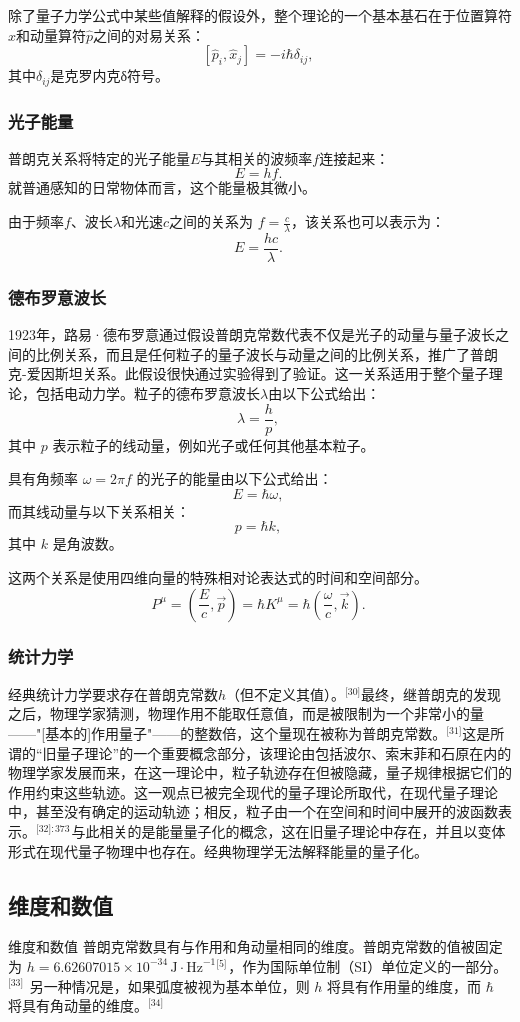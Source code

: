 除了量子力学公式中某些值解释的假设外，整个理论的一个基本基石在于位置算符\( \hat{x} \)和动量算符\( \hat{p} \)之间的对易关系：
\[
[{\hat {p}}_{i},{\hat {x}}_{j}] = -i\hbar \delta_{ij},~
\]
其中\( \delta_{ij} \)是克罗内克δ符号。
\subsubsection{光子能量}  
普朗克关系将特定的光子能量\( E \)与其相关的波频率\( f \)连接起来：
\[
E = hf.~
\]
就普通感知的日常物体而言，这个能量极其微小。

由于频率\( f \)、波长\( \lambda \)和光速\( c \)之间的关系为 \( f = \frac{c}{\lambda} \)，该关系也可以表示为：
\[
E = \frac{hc}{\lambda}.~
\]
\subsubsection{德布罗意波长}  
1923年，路易·德布罗意通过假设普朗克常数代表不仅是光子的动量与量子波长之间的比例关系，而且是任何粒子的量子波长与动量之间的比例关系，推广了普朗克-爱因斯坦关系。此假设很快通过实验得到了验证。这一关系适用于整个量子理论，包括电动力学。粒子的德布罗意波长\(\lambda\)由以下公式给出：
\[
\lambda = \frac{h}{p},~
\]
其中 \( p \) 表示粒子的线动量，例如光子或任何其他基本粒子。

具有角频率 \( \omega = 2\pi f \) 的光子的能量由以下公式给出：
\[
E = \hbar \omega,~
\]
而其线动量与以下关系相关：
\[
p = \hbar k,~
\]
其中 \( k \) 是角波数。

这两个关系是使用四维向量的特殊相对论表达式的时间和空间部分。
\[
P^{\mu} = \left( \frac{E}{c}, \vec{p} \right) = \hbar K^{\mu} = \hbar \left( \frac{\omega}{c}, \vec{k} \right).~
\]
\subsubsection{统计力学}  
经典统计力学要求存在普朗克常数\(h\)（但不定义其值）。\(^\text{[30]}\)最终，继普朗克的发现之后，物理学家猜测，物理作用不能取任意值，而是被限制为一个非常小的量——"[基本的]作用量子"——的整数倍，这个量现在被称为普朗克常数。\(^\text{[31]}\)这是所谓的“旧量子理论”的一个重要概念部分，该理论由包括波尔、索末菲和石原在内的物理学家发展而来，在这一理论中，粒子轨迹存在但被隐藏，量子规律根据它们的作用约束这些轨迹。这一观点已被完全现代的量子理论所取代，在现代量子理论中，甚至没有确定的运动轨迹；相反，粒子由一个在空间和时间中展开的波函数表示。\(^\text{[32]: 373 }\)与此相关的是能量量子化的概念，这在旧量子理论中存在，并且以变体形式在现代量子物理中也存在。经典物理学无法解释能量的量子化。
\subsection{维度和数值} 
维度和数值  
普朗克常数具有与作用和角动量相同的维度。普朗克常数的值被固定为 \( h = 6.62607015 \times 10^{-34} \, \text{J} \cdot \text{Hz}^{-1} \)\(^\text{[5] }\)，作为国际单位制（SI）单位定义的一部分。\(^\text{[33] }\) 另一种情况是，如果弧度被视为基本单位，则 \( h \) 将具有作用量的维度，而 \( \hbar \) 将具有角动量的维度。\(^\text{[34] }\)


